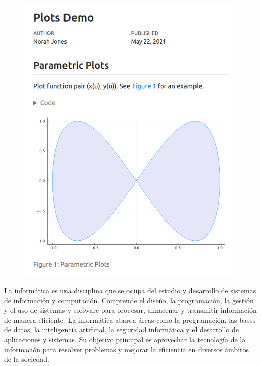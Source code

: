 \documentclass[
  letterpaper,
]{article}
\begin{document}
\begin{figure}

{\centering \includegraphics{images/hello-julia.png}

}

\end{figure}

\leavevmode{}%
La informática es una disciplina que se ocupa del estudio y desarrollo
de sistemas de información y computación. Comprende el diseño, la
programación, la gestión y el uso de sistemas y software para procesar,
almacenar y transmitir información de manera eficiente. La informática
abarca áreas como la programación, las bases de datos, la inteligencia
artificial, la seguridad informática y el desarrollo de aplicaciones y
sistemas. Su objetivo principal es aprovechar la tecnología de la
información para resolver problemas y mejorar la eficiencia en diversos
ámbitos de la sociedad.
\end{document}
